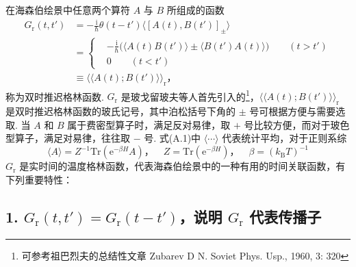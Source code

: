 在海森伯绘景中任意两个算符 $A$ 与 $B$ 所组成的函数
\begin{equation}
\begin{aligned}
G_{\mathrm{r}}(t,t')&=-\frac{\mathrm{i}}{\hbar}\theta(t-t')
\langle[A(t),B(t')]_{\pm}\rangle\\
&=\left\{
\begin{aligned}
&-\frac{\mathrm{i}}{\hbar}\bigl(\langle A(t)B(t')\rangle
\pm\langle B(t')A(t)\rangle\bigr)\qquad(t>t')\\
&0\qquad(t<t')
\end{aligned}\right.\\
&\equiv\langle\langle A(t);B(t')\rangle\rangle_{\mathrm{r}}\text{，}
\end{aligned}
\end{equation}
称为双时推迟格林函数. $G_{\mathrm{r}}$ 是玻戈留玻夫等人首先引入的\footnote{可参考祖巴烈夫的总结性文章 Zubarev D N. Soviet Phys. Usp., 1960, 3: 320}，$\langle\langle A(t);B(t')\rangle\rangle_{\mathrm{r}}$ 是双时推迟格林函数的玻氏记号，其中泊松括号下角的 $\pm$ 号可根据方便与需要选取. 当 $A$ 和 $B$ 属于费密型算子时，满足反对易律，取 $+$ 号比较方便，而对于玻色型算子，满足对易律，往往取 $-$ 号. 式(A.1)中 $\langle\cdots\rangle$ 代表统计平均，对于正则系综
\begin{equation}
\langle A\rangle=Z^{-1}\mathrm{Tr}(\mathrm{e}^{-\beta H}A)
\text{，}\quad Z=\mathrm{Tr}(\mathrm{e}^{-\beta H})
\text{，}\quad\beta=(k_{\mathrm{B}}T)^{-1}
\end{equation}
$G_{\mathrm{r}}$ 是实时间的温度格林函数，代表海森伯绘景中的一种有用的时间关联函数，有下列重要特性：

\subsection*{1. $G_{\mathrm{r}}(t,t')=G_{\mathrm{r}}(t-t')$，说明 $G_{\mathrm{r}}$ 代表传播子}

